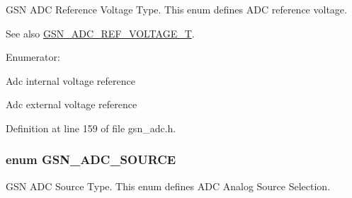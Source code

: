 GSN ADC Reference Voltage Type. This enum defines ADC reference voltage. 

\begin{DoxySeeAlso}{See also}
\hyperlink{a00643_ga560e320e7f3b88d78bb8d8766a8c7445}{GSN\_\-ADC\_\-REF\_\-VOLTAGE\_\-T}. 
\end{DoxySeeAlso}
\begin{Desc}
\item[Enumerator: ]\par
\begin{description}
\item[{\em 
\hypertarget{a00643_gga8371c67f612ecadda1e42fa07f34a967a1b5fc32b474b38286caf602cad737ed3}{
GSN\_\-ADC\_\-REF\_\-INTERNAL}
\label{a00643_gga8371c67f612ecadda1e42fa07f34a967a1b5fc32b474b38286caf602cad737ed3}
}]Adc internal voltage reference \item[{\em 
\hypertarget{a00643_gga8371c67f612ecadda1e42fa07f34a967a096151b970157e924b648e02bac39dbc}{
GSN\_\-ADC\_\-REF\_\-EXTERNAL}
\label{a00643_gga8371c67f612ecadda1e42fa07f34a967a096151b970157e924b648e02bac39dbc}
}]Adc external voltage reference \end{description}
\end{Desc}



Definition at line 159 of file gsn\_\-adc.h.

\hypertarget{a00643_gad3668c4c0f4514808fad4505e4f42900}{
\subsubsection[{GSN\_\-ADC\_\-SOURCE}]{\setlength{\rightskip}{0pt plus 5cm}enum {\bf GSN\_\-ADC\_\-SOURCE}}}
\label{a00643_gad3668c4c0f4514808fad4505e4f42900}


GSN ADC Source Type. This enum defines ADC Analog Source Selection. 

